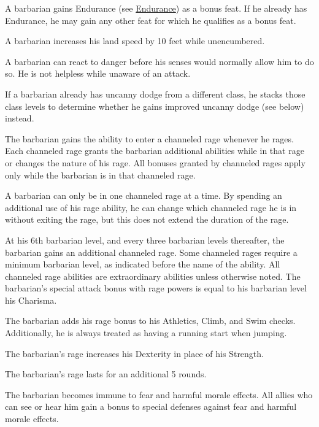  A barbarian gains Endurance (see \hyperlink{feat:Endurance}{Endurance}) as a bonus feat. If he already has Endurance, he may gain any other feat for which he qualifies as a bonus feat.

 A barbarian increases his land speed by 10 feet while unencumbered.

 A barbarian can react to danger before his senses would normally allow him to do so. He is not helpless while unaware of an attack.

If a barbarian already has uncanny dodge from a different class, he stacks those class levels to determine whether he gains improved uncanny dodge (see below) instead.

 The barbarian gains the ability to enter a channeled rage whenever he rages. Each channeled rage grants the barbarian additional abilities while in that rage or changes the nature of his rage. All bonuses granted by channeled rages apply only while the barbarian is in that channeled rage.

A barbarian can only be in one channeled rage at a time. By spending an additional use of his rage ability, he can change which channeled rage he is in without exiting the rage, but this does not extend the duration of the rage.

At his 6th barbarian level, and every three barbarian levels thereafter, the barbarian gains an additional channeled rage. Some channeled rages require a minimum barbarian level, as indicated before the name of the ability. All channeled rage abilities are extraordinary abilities unless otherwise noted. The barbarian's special attack bonus with rage powers is equal to his barbarian level \add his Charisma.

 The barbarian adds his rage bonus to his Athletics, Climb, and Swim checks. Additionally, he is always treated as having a running start when jumping.

 The barbarian's rage increases his Dexterity in place of his Strength.

 The barbarian's rage lasts for an additional 5 rounds.

 The barbarian becomes immune to fear and harmful morale effects. All allies who can see or hear him gain a  bonus to special defenses against fear and harmful morale effects.

